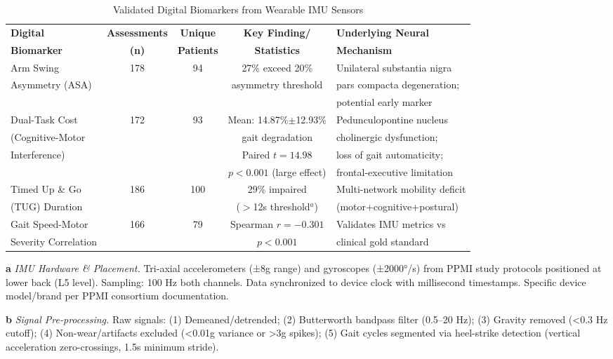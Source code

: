\documentclass[11pt]{article}
\begin{document}
\begin{table}[ht]
\centering
\caption{Validated Digital Biomarkers from Wearable IMU Sensors}
\label{tab:wearables}
\small
\begin{tabular}{lcccl}
\toprule
\textbf{Digital} & \textbf{Assessments} & \textbf{Unique} & \textbf{Key Finding/} & \textbf{Underlying Neural} \\
\textbf{Biomarker} & \textbf{(n)} & \textbf{Patients} & \textbf{Statistics} & \textbf{Mechanism} \\
\midrule
Arm Swing & 178 & 94 & 27\% exceed 20\% & Unilateral substantia nigra \\
Asymmetry (ASA) & & & asymmetry threshold & pars compacta degeneration; \\
& & & & potential early marker \\
\midrule
Dual-Task Cost & 172 & 93 & Mean: 14.87\%$\pm$12.93\% & Pedunculopontine nucleus \\
(Cognitive-Motor & & & gait degradation & cholinergic dysfunction; \\
Interference) & & & Paired $t=14.98$ & loss of gait automaticity; \\
& & & $p<0.001$ (large effect) & frontal-executive limitation \\
\midrule
Timed Up \& Go & 186 & 100 & 29\% impaired & Multi-network mobility deficit \\
(TUG) Duration & & & ($>$12s threshold$^a$) & (motor+cognitive+postural) \\
\midrule
Gait Speed-Motor & 166 & 79 & Spearman $r=-0.301$ & Validates IMU metrics vs \\
Severity Correlation & & & $p<0.001$ & clinical gold standard \\
\bottomrule
\end{tabular}
\begin{tablenotes}
\footnotesize
\item[\textbf{a}] \textit{IMU Hardware \& Placement.} Tri-axial accelerometers (±8g range) and gyroscopes (±2000°/s) from PPMI study protocols positioned at lower back (L5 level). Sampling: 100 Hz both channels. Data synchronized to device clock with millisecond timestamps. Specific device model/brand per PPMI consortium documentation.

\item[\textbf{b}] \textit{Signal Pre-processing.} Raw signals: (1) Demeaned/detrended; (2) Butterworth bandpass filter (0.5--20 Hz); (3) Gravity removed (<0.3 Hz cutoff); (4) Non-wear/artifacts excluded (<0.01g variance or >3g spikes); (5) Gait cycles segmented via heel-strike detection (vertical acceleration zero-crossings, 1.5s minimum stride).


\end{tablenotes}
\end{table}
\end{document}
